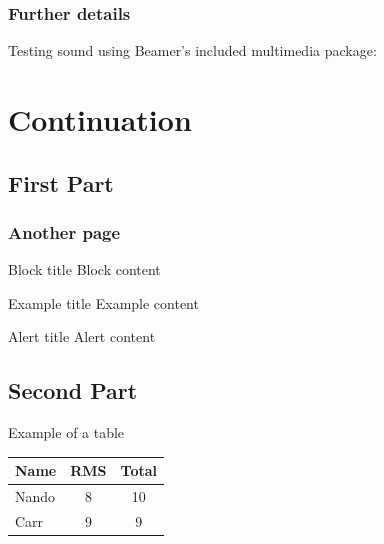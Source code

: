 \documentclass{beamer}
\begin{document}
\begin{frame}\frametitle{Further details}
Testing sound using Beamer's included multimedia package:


\end{frame}


\section[Cont]{Continuation}
\begin{frame}[plain]
    \tableofcontents[currentsection]
\end{frame}
\addtocounter{framenumber}{-1}  %

\subsection[First]{First Part}
\begin{frame}\frametitle{Another page}

    \begin{block}{Block title}
    Block content
    \end{block}

    \begin{example}{Example title}
    Example content
    \end{example}

    \begin{alertblock}{Alert title}
    Alert content
    \end{alertblock}

\end{frame}


\subsection[Second]{Second Part}
\begin{frame}{Example of a table}
    \begin{center}
        \begin{tabular}{l c c}
        \bf Name & \bf RMS & \bf Total \\
        \hline
        Nando & 8 & 10 \\
        Carr & 9 & 9 \\
        \hline
        \end{tabular}
    \end{center}
\end{frame}
\end{document}
